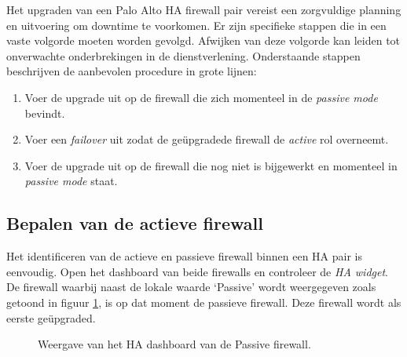 Het upgraden van een Palo Alto HA firewall pair vereist een zorgvuldige planning en uitvoering om downtime te voorkomen. Er zijn specifieke stappen die in een vaste volgorde moeten worden gevolgd. Afwijken van deze volgorde kan leiden tot onverwachte onderbrekingen in de dienstverlening. Onderstaande stappen beschrijven de aanbevolen procedure in grote lijnen:

\begin{enumerate}
    \item Voer de upgrade uit op de firewall die zich momenteel in de \textit{passive mode} bevindt.
    \item Voer een \textit{failover} uit zodat de geüpgradede firewall de \textit{active} rol overneemt.
    \item Voer de upgrade uit op de firewall die nog niet is bijgewerkt en momenteel in \textit{passive mode} staat.
\end{enumerate}

\subsection{Bepalen van de actieve firewall}
Het identificeren van de actieve en passieve firewall binnen een HA pair is eenvoudig. Open het dashboard van beide firewalls en controleer de \textit{HA widget}. De firewall waarbij naast de lokale waarde ‘Passive’ wordt weergegeven zoals getoond in figuur \ref{fig:PassiveFirewallHADashboard}, is op dat moment de passieve firewall. Deze firewall wordt als eerste geüpgraded. 

\begin{figure}[H]
    \centering
    \caption[PA High Availability Dashboard Passive Firewall]{\label{fig:PassiveFirewallHADashboard} Weergave van het HA dashboard van de Passive firewall.}
\end{figure}


